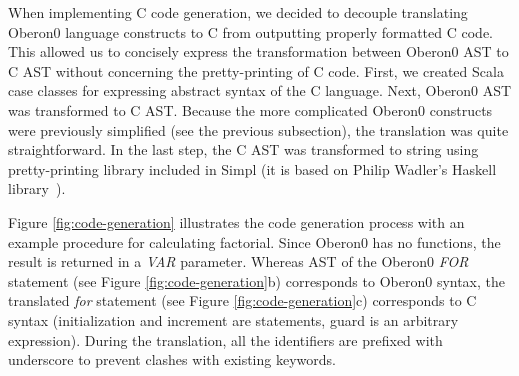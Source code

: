 When implementing C code generation, we decided to decouple translating
Oberon0 language constructs to C from outputting properly formatted
C code. This allowed us to concisely express the transformation between
Oberon0 AST to C AST without concerning the pretty-printing of C code.
First, we created Scala case classes for expressing abstract syntax
of the C language. Next, Oberon0 AST was transformed to C AST. Because
the more complicated Oberon0 constructs were previously simplified
(see the previous subsection), the translation was quite straightforward.
In the last step, the C AST was transformed to string using pretty-printing
library included in Simpl (it is based on Philip Wadler's Haskell 
library~\cite{wadler-prettyprinter}).

Figure \ref{fig:code-generation} illustrates the code generation
process with an example procedure for calculating factorial. Since
Oberon0 has no functions, the result is returned in a \emph{VAR} parameter.
Whereas AST of the Oberon0 \emph{FOR} statement (see Figure \ref{fig:code-generation}b)
corresponds to Oberon0 syntax, the translated \emph{for} statement
(see Figure \ref{fig:code-generation}c) corresponds to C syntax (initialization
and increment are statements, guard is an arbitrary expression). During
the translation, all the identifiers are prefixed with underscore
to prevent clashes with existing keywords.

